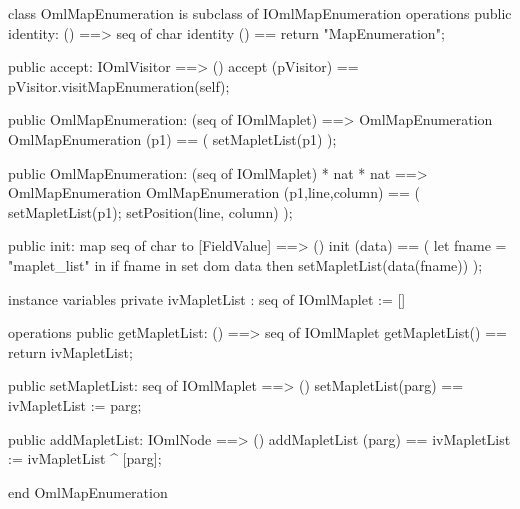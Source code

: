\begin{vdm_al}
class OmlMapEnumeration is subclass of IOmlMapEnumeration
operations
  public identity: () ==> seq of char
  identity () == return "MapEnumeration";

  public accept: IOmlVisitor ==> ()
  accept (pVisitor) == pVisitor.visitMapEnumeration(self);

  public OmlMapEnumeration:
    (seq of IOmlMaplet) ==> OmlMapEnumeration
  OmlMapEnumeration (p1) == 
    ( setMapletList(p1) );

  public OmlMapEnumeration:
    (seq of IOmlMaplet) *
    nat *
    nat ==> OmlMapEnumeration
  OmlMapEnumeration (p1,line,column) == 
    ( setMapletList(p1);
      setPosition(line, column) );

  public init: map seq of char to [FieldValue] ==> ()
  init (data) ==
    ( let fname = "maplet_list" in
        if fname in set dom data
        then setMapletList(data(fname)) );

instance variables
  private ivMapletList : seq of IOmlMaplet := []

operations
  public getMapletList: () ==> seq of IOmlMaplet
  getMapletList() == return ivMapletList;

  public setMapletList: seq of IOmlMaplet ==> ()
  setMapletList(parg) == ivMapletList := parg;

  public addMapletList: IOmlNode ==> ()
  addMapletList (parg) == ivMapletList := ivMapletList ^ [parg];

end OmlMapEnumeration
\end{vdm_al}

